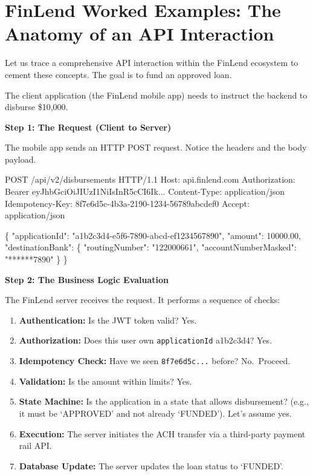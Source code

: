 \documentclass[
  11pt,
  openany,
  oneside]{book}
\newenvironment{Shaded}{}{}
\newcommand{\NormalTok}[1]{#1}
\providecommand{\tightlist}{%
  \setlength{\itemsep}{0pt}\setlength{\parskip}{0pt}}
\begin{document}
\section{FinLend Worked Examples: The Anatomy of an API
Interaction}\label{finlend-worked-examples-the-anatomy-of-an-api-interaction}

Let us trace a comprehensive API interaction within the FinLend
ecosystem to cement these concepts. The goal is to fund an approved
loan.

The client application (the FinLend mobile app) needs to instruct the
backend to disburse \$10,000.

\textbf{Step 1: The Request (Client to Server)}

The mobile app sends an HTTP POST request. Notice the headers and the
body payload.

\begin{Shaded}
\begin{Highlighting}[]
\NormalTok{POST /api/v2/disbursements HTTP/1.1}
\NormalTok{Host: api.finlend.com}
\NormalTok{Authorization: Bearer eyJhbGciOiJIUzI1NiIsInR5cCI6Ik...}
\NormalTok{Content{-}Type: application/json}
\NormalTok{Idempotency{-}Key: 8f7e6d5c{-}4b3a{-}2190{-}1234{-}56789abcdef0}
\NormalTok{Accept: application/json}

\NormalTok{\{}
\NormalTok{  "applicationId": "a1b2c3d4{-}e5f6{-}7890{-}abcd{-}ef1234567890",}
\NormalTok{  "amount": 10000.00,}
\NormalTok{  "destinationBank": \{}
\NormalTok{    "routingNumber": "122000661",}
\NormalTok{    "accountNumberMasked": "******7890"}
\NormalTok{  \}}
\NormalTok{\}}
\end{Highlighting}
\end{Shaded}

\textbf{Step 2: The Business Logic Evaluation}

The FinLend server receives the request. It performs a sequence of
checks:

\begin{enumerate}
\def\labelenumi{\arabic{enumi}.}
\tightlist
\item
  \textbf{Authentication:} Is the JWT token valid? Yes.
\item
  \textbf{Authorization:} Does this user own \texttt{applicationId}
  a1b2c3d4? Yes.
\item
  \textbf{Idempotency Check:} Have we seen \texttt{8f7e6d5c...} before?
  No.~Proceed.
\item
  \textbf{Validation:} Is the amount within limits? Yes.
\item
  \textbf{State Machine:} Is the application in a state that allows
  disbursement? (e.g., it must be `APPROVED' and not already `FUNDED').
  Let's assume yes.
\item
  \textbf{Execution:} The server initiates the ACH transfer via a
  third-party payment rail API.
\item
  \textbf{Database Update:} The server updates the loan status to
  `FUNDED'.
\end{enumerate}
\end{document}
